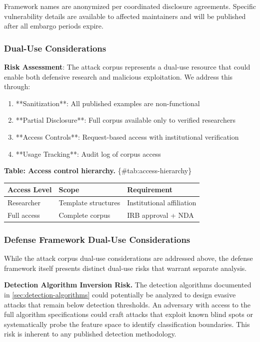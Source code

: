 \documentclass[
]{article}
\newcounter{none} %
\begin{document}
Framework names are anonymized per coordinated disclosure agreements.
Specific vulnerability details are available to affected maintainers and
will be published after all embargo periods expire.

\subsubsection{Dual-Use Considerations}\label{sec:dual-use}

\textbf{Risk Assessment}: The attack corpus represents a dual-use
resource that could enable both defensive research and malicious
exploitation. We address this through:

\begin{enumerate}
\item **Sanitization**: All published examples are non-functional
\item **Partial Disclosure**: Full corpus available only to verified researchers
\item **Access Controls**: Request-based access with institutional verification
\item **Usage Tracking**: Audit log of corpus access
\end{enumerate}

\textbf{Table: Access control hierarchy.} \{\#tab:access-hierarchy\}

{\def\LTcaptype{none} %
\begin{longtable}[]{@{}lll@{}}
\toprule\noalign{}
Access Level & Scope & Requirement \\
\midrule\noalign{}
\endhead
\bottomrule\noalign{}
\endlastfoot
Researcher & Template structures & Institutional affiliation \\
Full access & Complete corpus & IRB approval + NDA \\
\end{longtable}
}

\subsubsection{Defense Framework Dual-Use
Considerations}\label{sec:defense-dual-use}

While the attack corpus dual-use considerations are addressed above, the
defense framework itself presents distinct dual-use risks that warrant
separate analysis.

\textbf{Detection Algorithm Inversion Risk.} The detection algorithms
documented in \cref{sec:detection-algorithms} could potentially be
analyzed to design evasive attacks that remain below detection
thresholds. An adversary with access to the full algorithm
specifications could craft attacks that exploit known blind spots or
systematically probe the feature space to identify classification
boundaries. This risk is inherent to any published detection
methodology.
\end{document}
